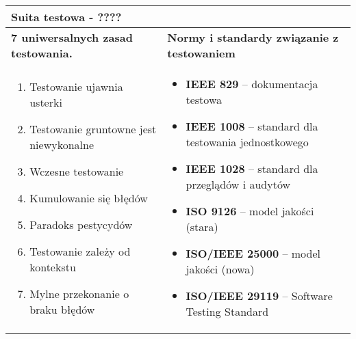 \documentclass[../main.tex]{subfiles}
\begin{document}
\begin{table}[H]
\begin{center}
\begin{tabular}{| p{8cm}| p{8cm}|}
                \textbf{Suita testowa} - ????
                \\
                \hline
                \textbf{7 uniwersalnych zasad testowania.} &  \textbf{Normy i standardy związanie z testowaniem}\\
                \hline
                \begin{enumerate}
                    \item Testowanie ujawnia usterki
                    \item Testowanie gruntowne jest niewykonalne
                    \item Wczesne testowanie
                    \item Kumulowanie się błędów
                    \item Paradoks pestycydów
                    \item Testowanie zależy od kontekstu
                    \item Mylne przekonanie o braku błędów
                \end{enumerate}
                &
                \begin{itemize}
                    \item \textbf{IEEE 829} – dokumentacja testowa
                    \item \textbf{IEEE 1008} – standard dla testowania jednostkowego
                    \item \textbf{IEEE 1028} – standard dla przeglądów i audytów
                    \item \textbf{ISO 9126} – model jakości (stara)
                    \item \textbf{ISO/IEEE 25000} – model jakości (nowa)
                    \item \textbf{ISO/IEEE 29119} – Software Testing Standard
                \end{itemize}\\
                \hline
            \end{tabular}
        \end{center}
    \end{table}
\end{document}
